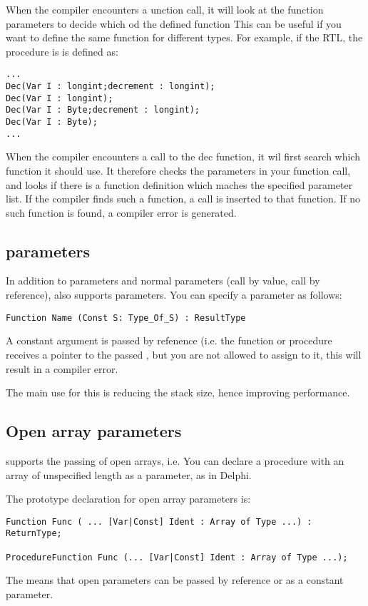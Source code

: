 \documentclass{report}
\begin{document}
When the compiler encounters a unction call, it will look at the function
parameters to decide which od the defined function
This can be useful if you want to define the same function for different
types. For example, if the RTL, the   procedure is
is defined as:
\begin{verbatim}
...
Dec(Var I : longint;decrement : longint);
Dec(Var I : longint);
Dec(Var I : Byte;decrement : longint);
Dec(Var I : Byte);
...
\end{verbatim}
When the compiler encounters a call to the dec function, it wil first search
which function it should use. It therefore checks the parameters in your
function call, and looks if there is a function definition which maches the
specified parameter list. If the compiler finds such a function, a call is
inserted to that function. If no such function is found, a compiler error is
generated.

\subsection{ parameters}
In addition to  parameters and normal parameters (call by value,
call by reference), \fpc also supports  parameters. You can
specify a  parameter as follows:
\begin{verbatim}
Function Name (Const S: Type_Of_S) : ResultType
\end{verbatim}
A constant argument is passed by refenence 
(i.e. the function or procedure receives a pointer to the passed , 
but you are not allowed to assign to it, this will result in a compiler error.

The main use for this is reducing the stack size, hence improving
performance.

\subsection{Open array parameters}
\fpc supports the passing of open arrays, i.e. You can declare a procedure
with an array of unspecified length as a parameter, as in Delphi.

The prototype declaration for open array parameters is:
\begin{verbatim}
Function Func ( ... [Var|Const] Ident : Array of Type ...) : ReturnType;

ProcedureFunction Func (... [Var|Const] Ident : Array of Type ...);
\end{verbatim}
The  means that open parameters can be passed by reference
or as a constant parameter.
\end{document}
